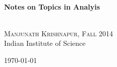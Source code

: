 \begin{titlepage}
\begin{center}

\HRule \\[0.4cm]
{ \Large \bfseries Notes on Topics in Analyis\\[0.4cm] }

\HRule \\[1.5cm]

\textsc{\Large Manjunath Krishnapur, Fall 2014}\\[0.5cm]

{\Large Indian Institute of Science}\\[0.5cm]

\vfill

{\large \today}

\end{center}
\end{titlepage}